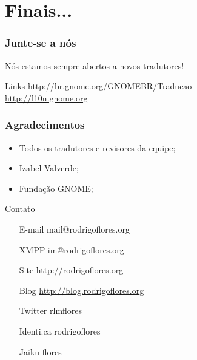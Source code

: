 \documentclass{beamer}
\begin{document}
\section{Finais...}

\begin{frame}
  \frametitle{Junte-se a nós}
  Nós estamos sempre abertos a novos tradutores!
  \begin{block}{Links}
     \url{http://br.gnome.org/GNOMEBR/Traducao}\\
     \url{http://l10n.gnome.org}
  \end{block}
\end{frame}


\begin{frame}
  \frametitle{Agradecimentos}

  \begin{itemize}[<+->]
    \item Todos os tradutores e revisores da equipe;
    \item Izabel Valverde;
    \item Fundação GNOME;     
  \end{itemize}
\end{frame}

\begin{frame}
    \begin{block}{Contato}     
    \begin{itemize}
            \centering
            \item[E-mail] mail@rodrigoflores.org 
            \item[XMPP]  im@rodrigoflores.org        
            \item[Site]  \url{http://rodrigoflores.org}
            \item[Blog]  \url{http://blog.rodrigoflores.org}        
            \item[Twitter] rlmflores 
            \item[Identi.ca] rodrigoflores        
            \item[Jaiku] flores        
        \end{itemize}
    \end{block}
\end{frame}
\end{document}
